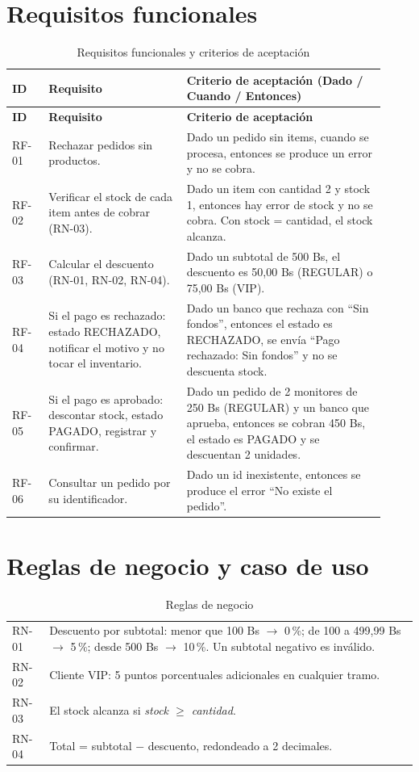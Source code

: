 \documentclass[11pt,a4paper,oneside]{report}
\begin{document}
\section{Requisitos funcionales}
\begin{longtable}{>{\raggedright\arraybackslash}p{0.09\linewidth}>{\raggedright\arraybackslash}p{0.34\linewidth}>{\raggedright\arraybackslash}p{0.49\linewidth}}
\caption{Requisitos funcionales y criterios de aceptación}\\
\toprule
\textbf{ID} & \textbf{Requisito} & \textbf{Criterio de aceptación (Dado / Cuando / Entonces)}\\
\midrule
\endfirsthead
\toprule
\textbf{ID} & \textbf{Requisito} & \textbf{Criterio de aceptación}\\
\midrule
\endhead
RF-01 & Rechazar pedidos sin productos. & Dado un pedido sin items, cuando se procesa, entonces se produce un error y no se cobra.\\
RF-02 & Verificar el stock de cada item antes de cobrar (RN-03). & Dado un item con cantidad 2 y stock 1, entonces hay error de stock y no se cobra. Con stock = cantidad, el stock alcanza.\\
RF-03 & Calcular el descuento (RN-01, RN-02, RN-04). & Dado un subtotal de 500 Bs, el descuento es 50,00 Bs (REGULAR) o 75,00 Bs (VIP).\\
RF-04 & Si el pago es rechazado: estado RECHAZADO, notificar el motivo y no tocar el inventario. & Dado un banco que rechaza con ``Sin fondos'', entonces el estado es RECHAZADO, se envía ``Pago rechazado: Sin fondos'' y no se descuenta stock.\\
RF-05 & Si el pago es aprobado: descontar stock, estado PAGADO, registrar y confirmar. & Dado un pedido de 2 monitores de 250 Bs (REGULAR) y un banco que aprueba, entonces se cobran 450 Bs, el estado es PAGADO y se descuentan 2 unidades.\\
RF-06 & Consultar un pedido por su identificador. & Dado un id inexistente, entonces se produce el error ``No existe el pedido''.\\
\bottomrule
\end{longtable}

\section{Reglas de negocio y caso de uso}
\begin{table}[H]
\centering
\caption{Reglas de negocio}
\small
\begin{tabularx}{\linewidth}{lX}
\toprule
RN-01 & Descuento por subtotal: menor que 100 Bs $\rightarrow$ 0\,\%; de 100 a 499,99 Bs $\rightarrow$ 5\,\%; desde 500 Bs $\rightarrow$ 10\,\%. Un subtotal negativo es inválido.\\
RN-02 & Cliente VIP: 5 puntos porcentuales adicionales en cualquier tramo.\\
RN-03 & El stock alcanza si \emph{stock $\geq$ cantidad}.\\
RN-04 & Total = subtotal $-$ descuento, redondeado a 2 decimales.\\
\bottomrule
\end{tabularx}
\end{table}
\end{document}
